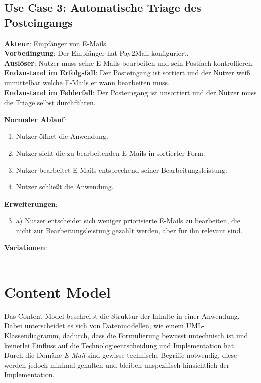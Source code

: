 \subsection*{Use Case 3: Automatische Triage des Posteingangs}
\textbf{Akteur}: Empfänger von E-Mails \\
\textbf{Vorbedingung}: Der Empfänger hat Pay2Mail konfiguriert. \\
\textbf{Auslöser}: Nutzer muss seine E-Mails bearbeiten und sein Postfach kontrollieren. \\
\textbf{Endzustand im Erfolgsfall}: Der Posteingang ist sortiert und der Nutzer weiß unmittelbar welche E-Mails er wann bearbeiten muss. \\
\textbf{Endzustand im Fehlerfall}: Der Posteingang ist unsortiert und der Nutzer muss die Triage selbst durchführen. 

\newpage

\noindent \textbf{Normaler Ablauf}:
\begin{enumerate}
    \item Nutzer öffnet die Anwendung.
    \item Nutzer sieht die zu bearbeitenden E-Mails in sortierter Form.
    \item Nutzer bearbeitet E-Mails entsprechend seiner Bearbeitungsleistung.
    \item Nutzer schließt die Anwendung.
\end{enumerate}

\noindent \textbf{Erweiterungen}:
\begin{enumerate}
\setcounter{enumi}{2}
    \item a) Nutzer entscheidet sich weniger priorisierte E-Mails zu bearbeiten, die nicht zur Bearbeitungsleistung gezählt werden, aber für ihn relevant sind.
\end{enumerate}

\noindent \textbf{Variationen}: \\
-


\section{Content Model}
\label{Content_Model}
Das Content Model beschreibt die Struktur der Inhalte in einer Anwendung. Dabei unterscheidet es sich von Datenmodellen, wie einem UML-Klassendiagramm, dadurch, dass die Formulierung bewusst untechnisch ist und keinerlei Einfluss auf die Technologieentscheidung und Implementation hat. Durch die Domäne \textit{E-Mail} sind gewisse technische Begriffe notwendig, diese werden jedoch minimal gehalten und bleiben unspezifisch hinsichtlich der Implementation. 

